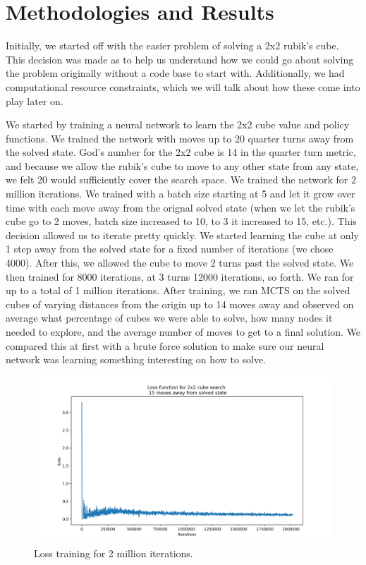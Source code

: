 \documentclass[10pt,twocolumn,letterpaper]{article}
\begin{document}
\section{Methodologies and Results}

Initially, we started off with the easier problem of solving a 2x2 rubik's cube. This decision was made as to help us understand how we could go about solving the problem originally without a code base to start with. Additionally, we had computational resource constraints, which we will talk about how these come into play later on.

We started by training a neural network to learn the 2x2 cube value and policy functions. We trained the network with moves up to 20 quarter turns away from the solved state. God's number for the 2x2 cube is 14 in the quarter turn metric, and because we allow the rubik's cube to move to any other state from any state, we felt 20 would sufficiently cover the search space. We trained the network for 2 million iterations. We trained with a batch size starting at 5 and let it grow over time with each move away from the orignal solved state (when we let the rubik's cube go to 2 moves, batch size increased to 10, to 3 it increased to 15, etc.). This decision allowed us to iterate pretty quickly.  We started learning the cube at only 1 step away from the solved state for a fixed number of iterations (we chose 4000). After this, we allowed the cube to move 2 turns past the solved state. We then trained for 8000 iterations, at 3 turns 12000 iterations, so forth. We ran for up to a total of 1 million iterations. After training, we ran MCTS on the solved cubes of varying distances from the origin up to 14 moves away and observed on average what percentage of cubes we were able to solve, how many nodes it needed to explore, and the average number of moves to get to a final solution. We compared this at first with a brute force solution to make sure our neural network was learning something interesting on how to solve. 



\begin{figure}
  \includegraphics[width=\linewidth]{loss.png}
  \caption{Loss training for 2 million iterations.}
  \label{fig:net}
\end{figure}
\end{document}
